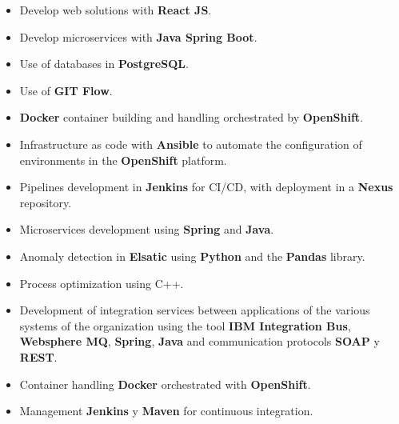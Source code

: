 \documentclass[letterpaper]{style} %
\begin{document}


\begin{itemize}
	\item Develop web solutions with \textbf{React JS}.
	\item Develop microservices with \textbf{Java Spring Boot}.
	\item Use of databases in \textbf{PostgreSQL}.
	\item Use of \textbf{GIT Flow}.
\end{itemize}

\divider

\begin{itemize}
	\item \textbf{Docker} container building and handling orchestrated by \textbf{OpenShift}.
	\item Infrastructure as code with \textbf{Ansible} to automate the configuration of environments in the \textbf {OpenShift} platform.
	\item Pipelines development in \textbf{Jenkins} for CI/CD, with deployment in a \textbf{Nexus} repository.
	\item Microservices development using \textbf{Spring} and \textbf{Java}.
	\item Anomaly detection in \textbf{Elsatic} using \textbf{Python} and the \textbf{Pandas} library.
	\item Process optimization using C++.
\end{itemize}



\newpage %

\makeprofileSecond %

\begin{itemize}
	\item Development of integration services between applications of the various systems of the organization using the tool \textbf{IBM Integration Bus}, \textbf{Websphere MQ}, \textbf{Spring}, \textbf{Java} and communication protocols \textbf{SOAP} y \textbf{REST}.
	\item Container handling \textbf{Docker} orchestrated with \textbf{OpenShift}.
	\item Management \textbf {Jenkins} y \textbf{Maven} for continuous integration.
\end{itemize}
\end{document}
